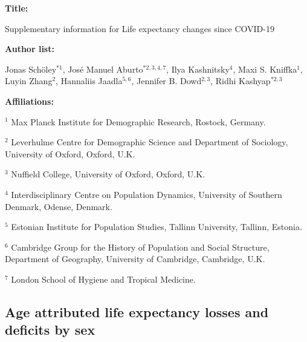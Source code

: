 \documentclass[12pt]{article}
\begin{document}
\begin{titlepage}


{\textbf{Title:}\par
Supplementary information for Life expectancy changes since COVID-19
\par\medskip}

{\textbf{Author list:}\par
Jonas Schöley$^{*1}$,
José Manuel Aburto$^{*2,3,4,7}$,
Ilya Kashnitsky$^{4}$,
Maxi S. Kniffka$^1$,
Luyin Zhang$^2$,
Hannaliis Jaadla$^{5,6}$,
Jennifer B. Dowd$^{2,3}$,
Ridhi Kashyap$^{*2,3}$
\par\medskip}

{\textbf{Affiliations:}\par
$^1$ Max Planck Institute for Demographic Research, Rostock, Germany.\par
$^2$ Leverhulme Centre for Demographic Science and Department of Sociology, University of Oxford, Oxford, U.K.\par
$^3$ Nuffield College, University of Oxford, Oxford, U.K.\par
$^4$ Interdisciplinary Centre on Population Dynamics, University of Southern Denmark, Odense, Denmark.\par
$^5$ Estonian Institute for Population Studies, Tallinn University, Tallinn, Estonia.\par
$^6$ Cambridge Group for the History of Population and Social Structure, Department of Geography, University of Cambridge, Cambridge, U.K.\par
$^7$ London School of Hygiene and Tropical Medicine.\par
\par\medskip}

\end{titlepage}

\renewcommand\thefigure{S\arabic{figure}}
\setcounter{figure}{0}
\renewcommand\thetable{S\arabic{table}}
\setcounter{table}{0}


\subsection*{Age attributed life expectancy losses and deficits by sex}
\end{document}
